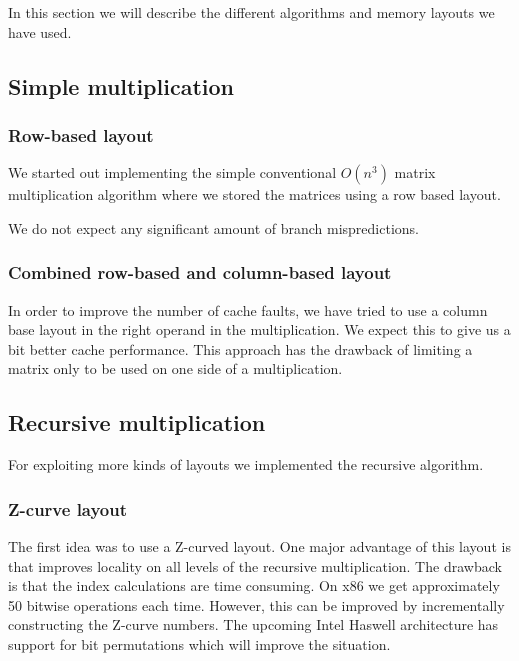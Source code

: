 In this section we will describe the different algorithms and memory
layouts we have used.

\subsection{Simple multiplication}

\subsubsection{Row-based layout}
We started out implementing the simple conventional $O(n^3)$ matrix
multiplication algorithm where we stored the matrices using a row
based layout.


We do not expect any significant amount of branch mispredictions.

\subsubsection{Combined row-based and column-based layout}

In order to improve the number of cache faults, we have tried to use a
column base layout in the right operand in the multiplication. We
expect this to give us a bit better cache performance. This approach
has the drawback of limiting a matrix only to be used on one side of a
multiplication.

\subsection{Recursive multiplication}

For exploiting more kinds of layouts we implemented the recursive algorithm.

\subsubsection{Z-curve layout}

The first idea was to use a Z-curved layout. One major advantage of this layout is that improves locality on all levels of the recursive multiplication. The drawback is that the index calculations are time consuming. On x86 we get approximately 50 bitwise operations each time. However, this can be improved by incrementally constructing the Z-curve numbers. The upcoming Intel Haswell architecture has support for bit permutations which will improve the situation.

